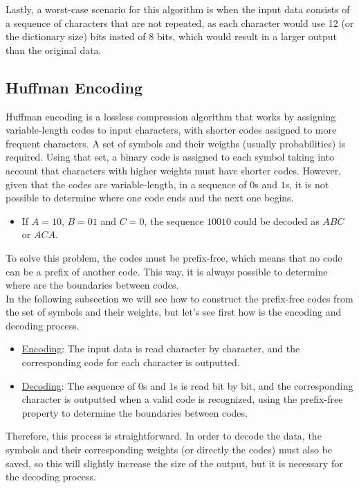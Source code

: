 Lastly, a worst-case scenario for this algorithm is when the input data consists of a sequence of characters that are not repeated, as each character would use 12 (or the dictionary size) bits insted of $8$ bits, which would result in a larger output than the original data.

\subsection{Huffman Encoding}

Huffman encoding is a lossless compression algorithm that works by assigning variable-length codes to input characters, with shorter codes assigned to more frequent characters. A set of symbols and their weigths (usually probabilities) is required. Using that set, a binary code is assigned to each symbol taking into account that characters with higher weights must have shorter codes. However, given that the codes are variable-length, in a sequence of $0$s and $1$s, it is not possible to determine where one code ends and the next one begins.
\begin{itemize}
    \item If $A=10$, $B=01$ and $C=0$, the sequence $10010$ could be decoded as $ABC$ or $ACA$.
\end{itemize}

To solve this problem, the codes must be prefix-free, which means that no code can be a prefix of another code. This way, it is always possible to determine where are the boundaries between codes.\\

In the following subsection we will see how to construct the prefix-free codes from the set of symbols and their weights, but let's see first how is the encoding and decoding process.
\begin{itemize}
    \item \ul{Encoding}: The input data is read character by character, and the corresponding code for each character is outputted.
    
    \item \ul{Decoding}: The sequence of $0$s and $1$s is read bit by bit, and the corresponding character is outputted when a valid code is recognized, using the prefix-free property to determine the boundaries between codes.
\end{itemize}

Therefore, this process is straightforward. In order to decode the data, the symbols and their corresponding weights (or directly the codes) must also be saved, so this will slightly increase the size of the output, but it is necessary for the decoding process.

